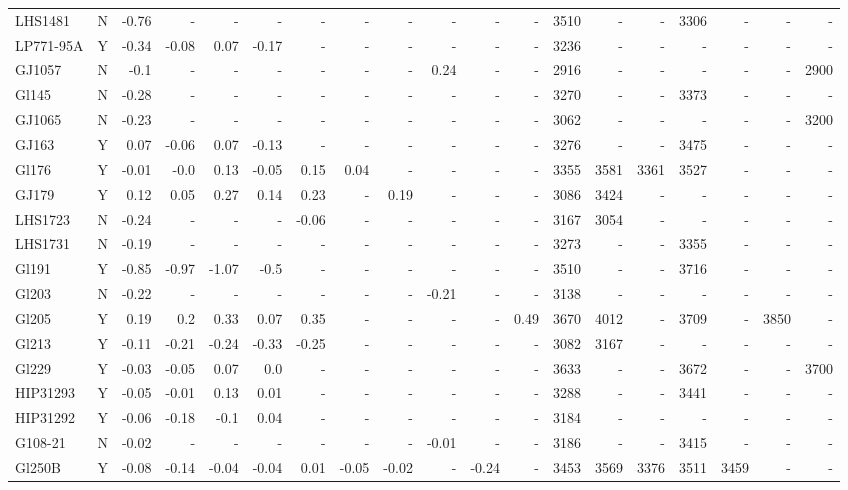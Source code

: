 \documentclass{aa}
\begin{document}
{\begin{landscape}
{\begin{longtable}{l c r r r r r r r r r r | r r r r r r r }
LHS1481 & N & -0.76 & - & - & - & - & - & - & - & - & - & 3510 & - & - & 3306 & - & - & - \\
LP771-95A & Y & -0.34 & -0.08 & 0.07 & -0.17 & - & - & - & - & - & - & 3236 & - & - & - & - & - & - \\
GJ1057 & N & -0.1 & - & - & - & - & - & - & 0.24 & - & - & 2916 & - & - & - & - & - & 2900 \\
Gl145 & N & -0.28 & - & - & - & - & - & - & - & - & - & 3270 & - & - & 3373 & - & - & - \\
GJ1065 & N & -0.23 & - & - & - & - & - & - & - & - & - & 3062 & - & - & - & - & - & 3200 \\
GJ163 & Y & 0.07 & -0.06 & 0.07 & -0.13 & - & - & - & - & - & - & 3276 & - & - & 3475 & - & - & - \\
Gl176 & Y & -0.01 & -0.0 & 0.13 & -0.05 & 0.15 & 0.04 & - & - & - & - & 3355 & 3581 & 3361 & 3527 & - & - & - \\
GJ179 & Y & 0.12 & 0.05 & 0.27 & 0.14 & 0.23 & - & 0.19 & - & - & - & 3086 & 3424 & - & - & - & - & - \\
LHS1723 & N & -0.24 & - & - & - & -0.06 & - & - & - & - & - & 3167 & 3054 & - & - & - & - & - \\
LHS1731 & N & -0.19 & - & - & - & - & - & - & - & - & - & 3273 & - & - & 3355 & - & - & - \\
Gl191 & Y & -0.85 & -0.97 & -1.07 & -0.5 & - & - & - & - & - & - & 3510 & - & - & 3716 & - & - & - \\
Gl203 & N & -0.22 & - & - & - & - & - & - & -0.21 & - & - & 3138 & - & - & - & - & - & - \\
Gl205 & Y & 0.19 & 0.2 & 0.33 & 0.07 & 0.35 & - & - & - & - & 0.49 & 3670 & 4012 & - & 3709 & - & 3850 & - \\
Gl213 & Y & -0.11 & -0.21 & -0.24 & -0.33 & -0.25 & - & - & - & - & - & 3082 & 3167 & - & - & - & - & - \\
Gl229 & Y & -0.03 & -0.05 & 0.07 & 0.0 & - & - & - & - & - & - & 3633 & - & - & 3672 & - & - & 3700 \\
HIP31293 & Y & -0.05 & -0.01 & 0.13 & 0.01 & - & - & - & - & - & - & 3288 & - & - & 3441 & - & - & - \\
HIP31292 & Y & -0.06 & -0.18 & -0.1 & 0.04 & - & - & - & - & - & - & 3184 & - & - & - & - & - & - \\
G108-21 & N & -0.02 & - & - & - & - & - & - & -0.01 & - & - & 3186 & - & - & 3415 & - & - & - \\
Gl250B & Y & -0.08 & -0.14 & -0.04 & -0.04 & 0.01 & -0.05 & -0.02 & - & -0.24 & - & 3453 & 3569 & 3376 & 3511 & 3459 & - & - \\

\end{longtable}}
\end{landscape}}
\end{document}
